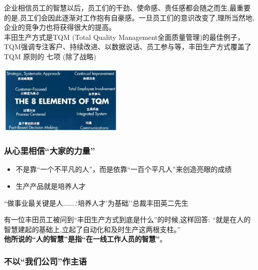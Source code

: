 企业相信员工的智慧以后，员工们的干劲、使命感、责任感都会随之而生,最重要的是,员工们会因此逐渐对工作抱有自豪感。一旦员工们的意识改变了,理所当然地,企业的竞争力也将获得很大的提高。\\
丰田生产方式是TQM (Total Quality
Management全面质量管理)的最佳例子，TQM强调专注客户、持续改进、以数据说话、员工参与等，丰田生产方式覆盖了
TQM 原则的 七项 (除了战略)


\includegraphics[width=6cm]{TQM_12.png}

\hypertarget{ux4eceux5fc3ux91ccux76f8ux4fe1ux5927ux5bb6ux7684ux529bux91cf}{%
\subsubsection{从心里相信``大家的力量''}\label{ux4eceux5fc3ux91ccux76f8ux4fe1ux5927ux5bb6ux7684ux529bux91cf}}

\begin{itemize}
\tightlist
\item
  不是靠``一个不平凡的人''，而是依靠``一百个平凡人''来创造亮眼的成绩
\item
  生产产品就是培养人才
\end{itemize}

\begin{description}
\tightlist
\item[]
``做事业最关键是人.......`培养人才'为基础''总裁丰田英二先生
\end{description}

\begin{description}
\tightlist
\item[]
有一位丰田员工被问到``丰田生产方式到底是什么''的时候,这样回答:
``就是在人的智慧建起的基础上,立起了自动化和及时生产这两根支柱。''\\

\textbf{他所说的``人的智慧''是指``在一线工作人员的智慧''}。\\
\end{description}

\hypertarget{ux4e0dux4ee5ux6211ux4eecux516cux53f8ux4f5cux4e3bux8bed}{%
\subsubsection{不以``我们公司''作主语}\label{ux4e0dux4ee5ux6211ux4eecux516cux53f8ux4f5cux4e3bux8bed}}

